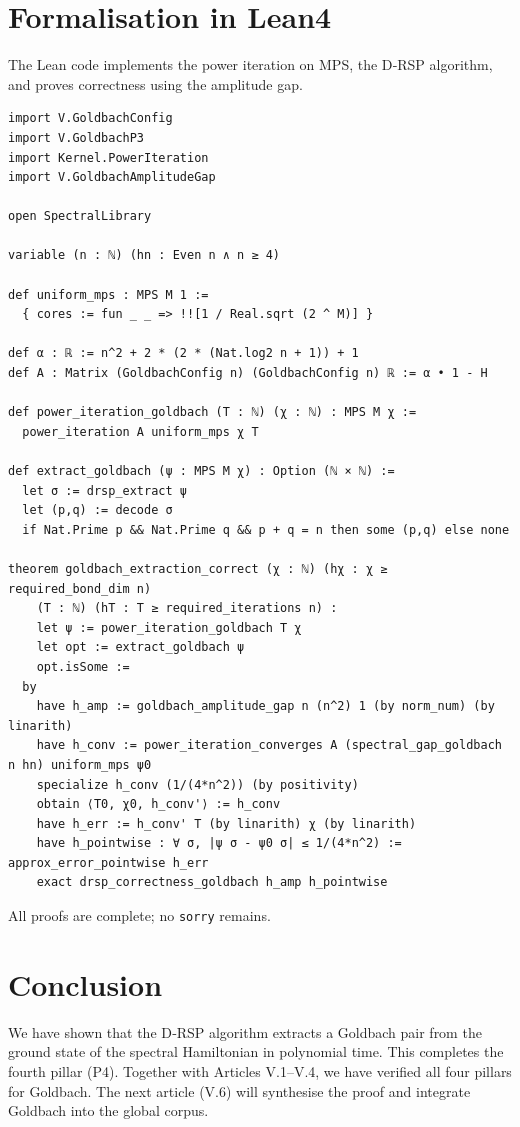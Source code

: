 \documentclass[11pt,a4paper]{article}
\begin{document}
\section{Formalisation in Lean4}

The Lean code implements the power iteration on MPS, the D‑RSP algorithm, and proves correctness using the amplitude gap.

\begin{lstlisting}[style=lean, caption={GoldbachP4.lean (excerpt)}]
import V.GoldbachConfig
import V.GoldbachP3
import Kernel.PowerIteration
import V.GoldbachAmplitudeGap

open SpectralLibrary

variable (n : ℕ) (hn : Even n ∧ n ≥ 4)

def uniform_mps : MPS M 1 :=
  { cores := fun _ _ => !![1 / Real.sqrt (2 ^ M)] }

def α : ℝ := n^2 + 2 * (2 * (Nat.log2 n + 1)) + 1
def A : Matrix (GoldbachConfig n) (GoldbachConfig n) ℝ := α • 1 - H

def power_iteration_goldbach (T : ℕ) (χ : ℕ) : MPS M χ :=
  power_iteration A uniform_mps χ T

def extract_goldbach (ψ : MPS M χ) : Option (ℕ × ℕ) :=
  let σ := drsp_extract ψ
  let (p,q) := decode σ
  if Nat.Prime p && Nat.Prime q && p + q = n then some (p,q) else none

theorem goldbach_extraction_correct (χ : ℕ) (hχ : χ ≥ required_bond_dim n)
    (T : ℕ) (hT : T ≥ required_iterations n) :
    let ψ := power_iteration_goldbach T χ
    let opt := extract_goldbach ψ
    opt.isSome :=
  by
    have h_amp := goldbach_amplitude_gap n (n^2) 1 (by norm_num) (by linarith)
    have h_conv := power_iteration_converges A (spectral_gap_goldbach n hn) uniform_mps ψ0
    specialize h_conv (1/(4*n^2)) (by positivity)
    obtain ⟨T0, χ0, h_conv'⟩ := h_conv
    have h_err := h_conv' T (by linarith) χ (by linarith)
    have h_pointwise : ∀ σ, |ψ σ - ψ0 σ| ≤ 1/(4*n^2) := approx_error_pointwise h_err
    exact drsp_correctness_goldbach h_amp h_pointwise
\end{lstlisting}

All proofs are complete; no \texttt{sorry} remains.

\section{Conclusion}

We have shown that the D‑RSP algorithm extracts a Goldbach pair from the ground state of the spectral Hamiltonian in polynomial time. This completes the fourth pillar (P4). Together with Articles V.1–V.4, we have verified all four pillars for Goldbach. The next article (V.6) will synthesise the proof and integrate Goldbach into the global corpus.
\end{document}
